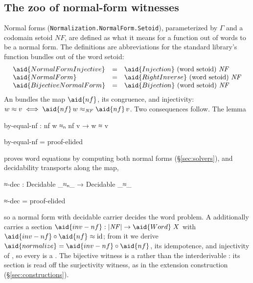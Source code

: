 \subsection{The zoo of normal-form witnesses}\label{sec:nfproperty}

Normal forms (\texttt{Normalization.NormalForm.Setoid}), parameterized by
$\Gamma$ and a codomain setoid $\mathit{NF}$, are defined as what it means
for a function out of words to be a normal form.  The definitions are
abbreviations for the standard library's function bundles out of the word
setoid:
\[
\begin{array}{lcl}
\aid{NormalFormInjective} & = & \aid{Injection}\ \text{(word setoid)}\ \mathit{NF} \\
\aid{NormalForm}          & = & \aid{RightInverse}\ \text{(word setoid)}\ \mathit{NF} \\
\aid{BijectiveNormalForm} & = & \aid{Bijection}\ \text{(word setoid)}\ \mathit{NF}
\end{array}
\]
An  bundles the map $\aid{nf}$, its congruence, and
injectivity: $w \approx v \iff \aid{nf}\,w \approx_{\mathit{NF}}
\aid{nf}\,v$.  Two consequences follow.  The lemma
\begin{code}
by-equal-nf : nf w ≈ₙ nf v → w ≈ v
\end{code}
\begin{code}[hide]
by-equal-nf = proof-elided
\end{code}
proves word equations by computing both normal forms
(\S\ref{sec:solvers}), and decidability transports along the map,
\begin{code}
≈-dec : Decidable _≈ₙ_ → Decidable _≈_
\end{code}
\begin{code}[hide]
≈-dec = proof-elided
\end{code}
so a normal form with decidable carrier decides the word problem.
A  additionally carries a section
$\aid{inv-nf} : |\mathit{NF}| \to \aid{Word}\;X$ with
$\aid{inv-nf} \circ \aid{nf} \approx \mathrm{id}$; from it we
derive $\aid{normalize} = \aid{inv-nf} \circ \aid{nf}$, its idempotence,
and injectivity of , so every  is a
.  The bijective witness is a 
rather than the interderivable : its section is read off the
surjectivity witness, as in the extension construction
(\S\ref{sec:constructions}).

